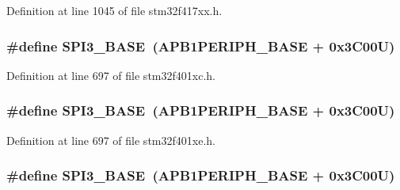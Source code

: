 Definition at line 1045 of file stm32f417xx.\+h.

\subsubsection[{\texorpdfstring{S\+P\+I3\+\_\+\+B\+A\+SE}{SPI3_BASE}}]{\setlength{\rightskip}{0pt plus 5cm}\#define S\+P\+I3\+\_\+\+B\+A\+SE~({\bf A\+P\+B1\+P\+E\+R\+I\+P\+H\+\_\+\+B\+A\+SE} + 0x3\+C00\+U)}\hypertarget{group___peripheral__registers__structures_gae634fe8faa6922690e90fbec2fc86162}{}\label{group___peripheral__registers__structures_gae634fe8faa6922690e90fbec2fc86162}


Definition at line 697 of file stm32f401xc.\+h.

\subsubsection[{\texorpdfstring{S\+P\+I3\+\_\+\+B\+A\+SE}{SPI3_BASE}}]{\setlength{\rightskip}{0pt plus 5cm}\#define S\+P\+I3\+\_\+\+B\+A\+SE~({\bf A\+P\+B1\+P\+E\+R\+I\+P\+H\+\_\+\+B\+A\+SE} + 0x3\+C00\+U)}\hypertarget{group___peripheral__registers__structures_gae634fe8faa6922690e90fbec2fc86162}{}\label{group___peripheral__registers__structures_gae634fe8faa6922690e90fbec2fc86162}


Definition at line 697 of file stm32f401xe.\+h.

\subsubsection[{\texorpdfstring{S\+P\+I3\+\_\+\+B\+A\+SE}{SPI3_BASE}}]{\setlength{\rightskip}{0pt plus 5cm}\#define S\+P\+I3\+\_\+\+B\+A\+SE~({\bf A\+P\+B1\+P\+E\+R\+I\+P\+H\+\_\+\+B\+A\+SE} + 0x3\+C00\+U)}\hypertarget{group___peripheral__registers__structures_gae634fe8faa6922690e90fbec2fc86162}{}\label{group___peripheral__registers__structures_gae634fe8faa6922690e90fbec2fc86162}


